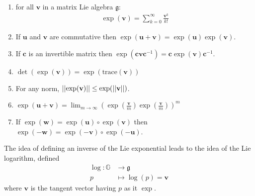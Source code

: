 \begin{enumerate}
	\item for all $\mathbf{v}$ in a matrix Lie algebra $\mathfrak{g}$:
	\begin{align*}
	\exp(\mathbf{v}) = \sum_{k=0}^{\infty} \frac{\mathbf{v}^{k}}{k!}
	\end{align*}
	\item If $\mathbf{u}$ and $\mathbf{v}$ are commutative then $\exp(\mathbf{u} + \mathbf{v}) = \exp(\mathbf{u})\exp(\mathbf{v})$.
	\item If $\mathbf{c}$ is an invertible matrix then $\exp(\mathbf{c}\mathbf{v}\mathbf{c}^{-1}) = \mathbf{c}\exp(\mathbf{v})\mathbf{c}^{-1}$.
	\item $\det(\exp(\mathbf{v})) = \exp(\text{trace}(\mathbf{v}))$
	\item For any norm, $\vert\lvert \exp(\mathbf{v}) \rvert\vert \leq \exp(\vert\lvert \mathbf{v} \rvert\vert)$.
	\item  $\exp(\mathbf{u} + \mathbf{v}) =\lim_{m\rightarrow \infty} (\exp(\frac{\mathbf{v}}{m})\exp(\frac{\mathbf{v}}{m}))^{m}$
	\item If $\exp(\mathbf{w}) = \exp(\mathbf{u}) \circ \exp(\mathbf{v})$ then $\exp(\mathbf{-w}) = \exp(\mathbf{-v}) \circ \exp(\mathbf{-u})$.
\end{enumerate}
The idea of defining an inverse of the Lie exponential leads to the idea of the Lie logarithm, defined
\begin{align*}
\log : \mathbb{G} & \longrightarrow \mathfrak{g} \\
p &\longmapsto \log (p)  =  \mathbf{v}   
\end{align*}
where $\mathbf{v}  $ is the tangent vector having $p$ as it $\exp$.\\


